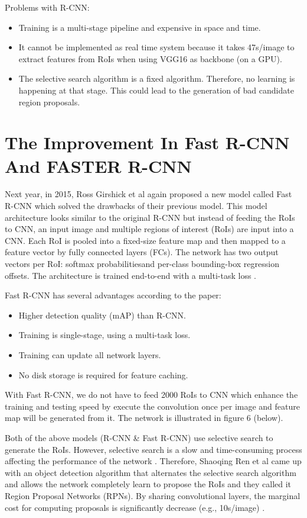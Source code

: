 	
	Problems with R-CNN:
	\begin{itemize}
		\item Training is a multi-stage pipeline and expensive in space and time.
		\item It cannot be implemented as real time system because it takes 47s/image to extract features from RoIs when using VGG16 as backbone (on a GPU).
		\item The selective search algorithm is a fixed algorithm. Therefore, no learning is happening at that stage. This could lead to the generation of bad candidate region proposals.
	\end{itemize}

\section{The Improvement In Fast R-CNN And FASTER R-CNN}
\noindent
	
	Next year, in 2015, Ross Girshick et al again proposed a new model called Fast R-CNN which solved the drawbacks of their previous model. This model architecture looks similar to the original R-CNN but instead of feeding the RoIs to CNN, an input image and multiple regions of interest (RoIs) are input into a CNN. Each RoI is pooled into a fixed-size feature map and then mapped to a feature vector by fully connected layers (FCs). The network has two output vectors per RoI: softmax probabilitiesand per-class bounding-box regression offsets. The architecture is trained end-to-end with a multi-task loss \cite{fastrcnn}.
	
	Fast R-CNN has several advantages according to the paper:
	\begin{itemize}
		\item Higher detection quality (mAP) than R-CNN.
		\item Training is single-stage, using a multi-task loss.
		\item Training can update all network layers.
		\item No disk storage is required for feature caching.
	\end{itemize}
	
	With Fast R-CNN, we do not have to feed 2000 RoIs to CNN which enhance the training and testing speed by execute the convolution once per image and feature map will be generated from it. The network is illustrated in figure 6 (below).
	
	Both of the above models (R-CNN \& Fast R-CNN) use selective search to generate the RoIs. However, selective search is a slow and time-consuming process affecting the performance of the network \cite{fasterrcnn}. Therefore, Shaoqing Ren et al came up with an object detection algorithm that alternates the selective search algorithm and allows the network completely learn to propose the RoIs and they called it Region Proposal Networks (RPNs). By sharing convolutional layers, the marginal cost for computing proposals is significantly decrease (e.g., 10s/image) \cite{fasterrcnn}.
	
